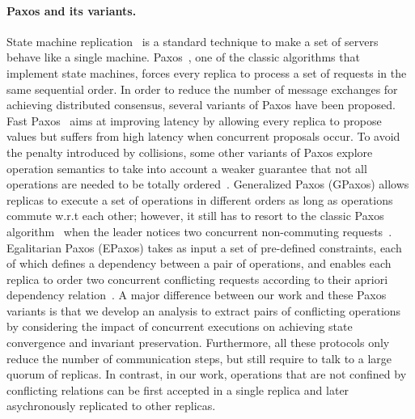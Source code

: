 \paragraph{Paxos and its variants.} State machine replication~\cite{Schneider1990RSM} is
a standard technique to make a set of servers behave like a single machine.
Paxos~\cite{Lamport1998Paxos}, one of the classic algorithms that implement state machines,
forces every replica to process a set of requests in the same
sequential order. In order to reduce the number of message exchanges for achieving distributed
consensus, several variants of Paxos have been proposed. Fast Paxos~\cite{Lamport2006FastPaxos} aims
at improving latency by allowing every replica to propose values but suffers from high latency when concurrent
proposals occur. To avoid the penalty introduced by collisions, some other variants of Paxos explore 
operation semantics to take into account a weaker guarantee that
not all operations are needed to be totally ordered~\cite{Lamport2005GeneralizedPaxos, Moraru2013EPaxos}. 
Generalized Paxos (GPaxos) allows replicas to execute a set of operations in
different orders as long as operations commute w.r.t each other; however, it still has to resort to 
the classic Paxos algorithm~\cite{Lamport1998Paxos} when the leader notices two concurrent non-commuting requests~\cite{Lamport2005GeneralizedPaxos}.
Egalitarian Paxos (EPaxos) takes as input a set of pre-defined constraints, each of which defines a dependency 
between a pair of operations, and enables each replica to order two concurrent conflicting requests according
to their apriori dependency relation~\cite{Moraru2013EPaxos}. 
A major difference between our work and these Paxos variants is that we
develop an analysis to extract pairs of conflicting operations by considering the impact of
concurrent executions on achieving state convergence and invariant preservation. 
Furthermore, all these protocols only reduce the number of communication steps, but
still require to talk to a large quorum of replicas. In contrast, in our work,
operations that are not confined by conflicting relations can be first accepted
in a single replica and later asychronously replicated to other replicas.


